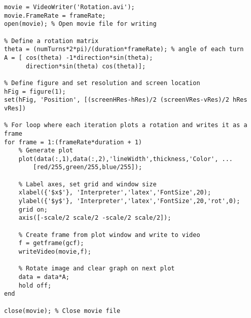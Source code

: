 \documentclass{article}
\begin{document}
\begin{lstlisting}[style=Matlab-editor]
% Initialize movie
movie = VideoWriter('Rotation.avi');
movie.FrameRate = frameRate;
open(movie); % Open movie file for writing

% Define a rotation matrix
theta = (numTurns*2*pi)/(duration*frameRate); % angle of each turn
A = [ cos(theta) -1*direction*sin(theta);
      direction*sin(theta) cos(theta)];

% Define figure and set resolution and screen location
hFig = figure(1);
set(hFig, 'Position', [(screenHRes-hRes)/2 (screenVRes-vRes)/2 hRes vRes])

% For loop where each iteration plots a rotation and writes it as a frame
for frame = 1:(frameRate*duration + 1)
    % Generate plot
    plot(data(:,1),data(:,2),'lineWidth',thickness,'Color', ...
        [red/255,green/255,blue/255]);
    
    % Label axes, set grid and window size
    xlabel({'$x$'}, 'Interpreter','latex','FontSize',20);
    ylabel({'$y$'}, 'Interpreter','latex','FontSize',20,'rot',0);
    grid on;
    axis([-scale/2 scale/2 -scale/2 scale/2]);
    
    % Create frame from plot window and write to video
    f = getframe(gcf);
    writeVideo(movie,f);
    
    % Rotate image and clear graph on next plot
    data = data*A;
    hold off;
end

close(movie); % Close movie file
\end{lstlisting}
\end{document}
